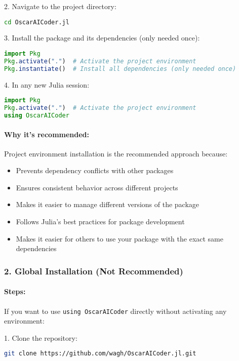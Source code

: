 \documentclass[11pt,a4paper]{article}
\newcommand{\code}[1]{\texttt{#1}}
\providecommand{\code}[1]{\texttt{\color{blue!70!black}#1}}
\begin{document}
2. Navigate to the project directory:
\begin{lstlisting}[language=bash]
cd OscarAICoder.jl
\end{lstlisting}

3. Install the package and its dependencies (only needed once):
\begin{lstlisting}[language=Julia]
import Pkg
Pkg.activate(".")  # Activate the project environment
Pkg.instantiate()  # Install all dependencies (only needed once)
\end{lstlisting}

4. In any new Julia session:
\begin{lstlisting}[language=Julia]
import Pkg
Pkg.activate(".")  # Activate the project environment
using OscarAICoder
\end{lstlisting}

\paragraph{Why it's recommended:}
Project environment installation is the recommended approach because:
\begin{itemize}
    \item Prevents dependency conflicts with other packages
    \item Ensures consistent behavior across different projects
    \item Makes it easier to manage different versions of the package
    \item Follows Julia's best practices for package development
    \item Makes it easier for others to use your package with the exact same dependencies
\end{itemize}

\subsubsection{2. Global Installation (Not Recommended)}

\paragraph{Steps:}
If you want to use \code{using OscarAICoder} directly without activating any environment:

1. Clone the repository:
\begin{lstlisting}[language=bash]
git clone https://github.com/wagh/OscarAICoder.jl.git
\end{lstlisting}
\end{document}
